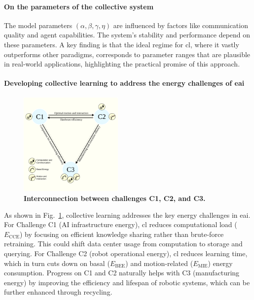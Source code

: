 \documentclass[12pt]{article}
\begin{document}
\paragraph*{On the parameters of the collective system}
The model parameters $(\alpha, \beta, \gamma, \eta)$ are influenced by factors like communication quality and agent capabilities. The system's stability and performance depend on these parameters. A key finding is that the ideal regime for \ac{cl}, where it vastly outperforms other paradigms, corresponds to parameter ranges that are plausible in real-world applications, highlighting the practical promise of this approach.

\paragraph*{Developing collective learning to address the energy challenges of \ac{eai}}
\begin{figure}[!t]
	\centering
	\includegraphics[width=0.45\textwidth]{fig/grand_challenges_connections.png}
	\caption{\textbf{Interconnection between challenges C1, C2, and C3.}}
	\label{fig:challengesConnected_revised}
\end{figure}
As shown in Fig.~\ref{fig:challengesConnected_revised}, collective learning addresses the key energy challenges in \ac{eai}. For Challenge C1 (AI infrastructure energy), \ac{cl} reduces computational load ($E_\text{CCE}$) by focusing on efficient knowledge sharing rather than brute-force retraining. This could shift data center usage from computation to storage and querying. For Challenge C2 (robot operational energy), \ac{cl} reduces learning time, which in turn cuts down on basal ($E_\text{BEE}$) and motion-related ($E_\text{MIE}$) energy consumption. Progress on C1 and C2 naturally helps with C3 (manufacturing energy) by improving the efficiency and lifespan of robotic systems, which can be further enhanced through recycling.
\end{document}

